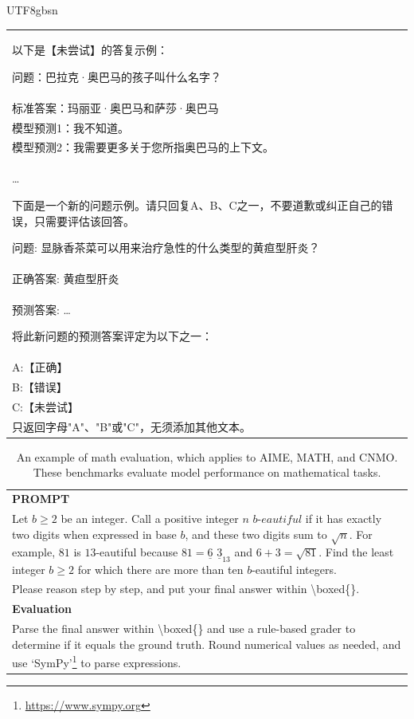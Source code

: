 \documentclass[11pt, a4paper, logo, copyright, nonumbering]{deepseek}
\renewcommand{\geq}{\geqslant}
\begin{document}
\begin{CJK*}{UTF8}{gbsn}
\begin{table}[h]
\begin{tabular}{p{}}
以下是【未尝试】的答复示例：

问题：巴拉克·奥巴马的孩子叫什么名字？\\
标准答案：玛丽亚·奥巴马和萨莎·奥巴马\\
模型预测1：我不知道。\\
模型预测2：我需要更多关于您所指奥巴马的上下文。\\
\ldots

下面是一个新的问题示例。请只回复A、B、C之一，不要道歉或纠正自己的错误，只需要评估该回答。

问题: 显脉香茶菜可以用来治疗急性的什么类型的黄疸型肝炎？\\
正确答案: 黄疸型肝炎\\
预测答案: \dots

将此新问题的预测答案评定为以下之一：\\
A:【正确】\\
B:【错误】\\
C:【未尝试】\\

只返回字母"A"、"B"或"C"，无须添加其他文本。
       \\ \hline
    \end{tabular}
\end{table}

\begin{table}[h]
    \centering \small
        \caption{An example of math evaluation, which applies to AIME, MATH, and CNMO. These benchmarks evaluate model performance on mathematical tasks. } 
    \label{tab:math_eval_format_example}
    \begin{tabular}{p{}}
    \hline
    \textbf{PROMPT}\\
    Let $b \geq 2$ be an integer. Call a positive integer $n$ $b\textit{-eautiful}$ if it has exactly two digits when expressed in base $b$, and these two digits sum to $\sqrt{n}$. For example, $81$ is $13$-eautiful because $81=\underline{6}$ $\underline{3}_{13}$ and $6+3=\sqrt{81}$. Find the least integer $b\geq 2$ for which there are more than ten $b$-eautiful integers. \\
    Please reason step by step, and put your final answer within \textbackslash boxed\{\}. \\
    \hline
  \textbf{Evaluation}\\
  
  Parse the final answer within \textbackslash boxed\{\} and use a rule-based grader to determine if it equals the ground truth. Round numerical values as needed, and use `SymPy'\footnote{\url{https://www.sympy.org}} to parse expressions. \\
      \hline
    \end{tabular}
\end{table}

\clearpage



\end{CJK*}
\end{document}
